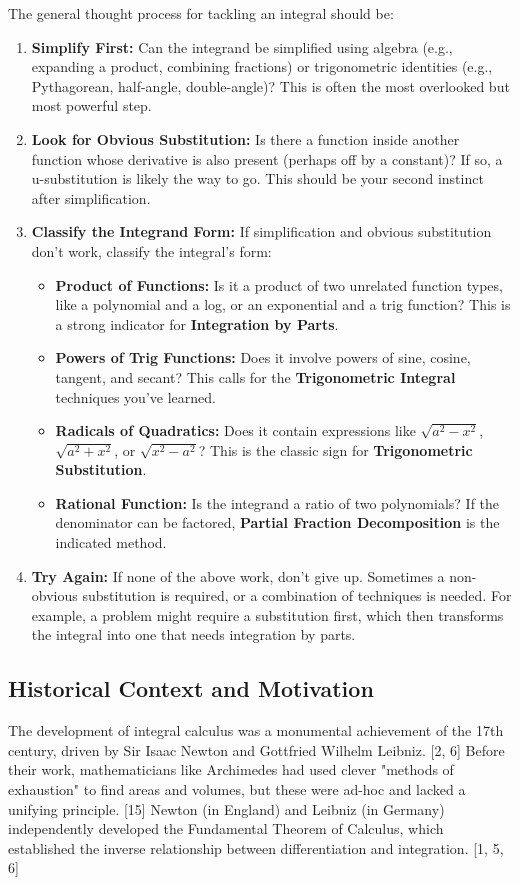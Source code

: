 \documentclass{article}
\begin{document}
The general thought process for tackling an integral should be:
\begin{enumerate}
    \item \textbf{Simplify First:} Can the integrand be simplified using algebra (e.g., expanding a product, combining fractions) or trigonometric identities (e.g., Pythagorean, half-angle, double-angle)? This is often the most overlooked but most powerful step.
    \item \textbf{Look for Obvious Substitution:} Is there a function inside another function whose derivative is also present (perhaps off by a constant)? If so, a u-substitution is likely the way to go. This should be your second instinct after simplification.
    \item \textbf{Classify the Integrand Form:} If simplification and obvious substitution don't work, classify the integral's form:
    \begin{itemize}
        \item \textbf{Product of Functions:} Is it a product of two unrelated function types, like a polynomial and a log, or an exponential and a trig function? This is a strong indicator for \textbf{Integration by Parts}.
        \item \textbf{Powers of Trig Functions:} Does it involve powers of sine, cosine, tangent, and secant? This calls for the \textbf{Trigonometric Integral} techniques you've learned.
        \item \textbf{Radicals of Quadratics:} Does it contain expressions like $\sqrt{a^2 - x^2}$, $\sqrt{a^2 + x^2}$, or $\sqrt{x^2 - a^2}$? This is the classic sign for \textbf{Trigonometric Substitution}.
        \item \textbf{Rational Function:} Is the integrand a ratio of two polynomials? If the denominator can be factored, \textbf{Partial Fraction Decomposition} is the indicated method.
    \end{itemize}
    \item \textbf{Try Again:} If none of the above work, don't give up. Sometimes a non-obvious substitution is required, or a combination of techniques is needed. For example, a problem might require a substitution first, which then transforms the integral into one that needs integration by parts.
\end{enumerate}

\subsection{Historical Context and Motivation}
The development of integral calculus was a monumental achievement of the 17th century, driven by Sir Isaac Newton and Gottfried Wilhelm Leibniz. [2, 6] Before their work, mathematicians like Archimedes had used clever "methods of exhaustion" to find areas and volumes, but these were ad-hoc and lacked a unifying principle. [15] Newton (in England) and Leibniz (in Germany) independently developed the Fundamental Theorem of Calculus, which established the inverse relationship between differentiation and integration. [1, 5, 6]
\end{document}
